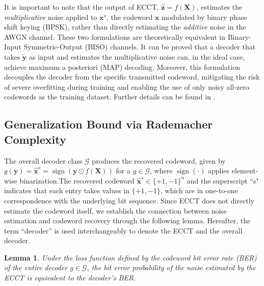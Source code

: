 \documentclass[lettersize,onecolumn]{IEEEtran}
\newtheorem{lemma}{Lemma}
\begin{document}
It is important to note that the output of ECCT, $\hat{\mathbf{z}}=f(\mathbf{X})$, estimates the \emph{multiplicative} noise applied to $\mathbf{x}^{s}$, the codeword $\mathbf{x}$ modulated by binary phase shift keying (BPSK), rather than directly estimating the \emph{additive} noise in the AWGN channel\cite{bennatan2018syndromebasedapproach,choukroun2022ECCT}. These two formulations are theoretically equivalent in Binary-Input Symmetric-Output (BISO) channels\cite{richardson2002LDPCcapacityundermessagepassingdecoding}. It can be proved that a decoder that takes $\tilde{\mathbf{y}}$ as input and estimates the multiplicative noise can, in the ideal case, achieve maximum a posteriori (MAP) decoding. Moreover, this formulation decouples the decoder from the specific transmitted codeword, mitigating the risk of severe overfitting during training and enabling the use of only noisy all-zero codewords as the training dataset. Further details can be found in \cite{bennatan2018syndromebasedapproach}.

\subsection{Generalization Bound via Rademacher Complexity}
The overall decoder class $\mathcal{G}$ produces the recovered codeword, given by $g(\mathbf{y})=\hat{\mathbf{x}}^{s}=\operatorname{sign}(\mathbf{y} \odot f(\mathbf{X}))$ for a $g \in \mathcal{G}$, where $\operatorname{sign}(\cdot)$ applies element-wise binarization.The recovered codeword $\hat{\mathbf{x}}^{s}\in \{+1, -1\}^{n}$ and the superscript ``s" indicates that each entry takes values in $\{+1,-1\}$, which are in one-to-one correspondence with the underlying bit sequence. Since ECCT does not directly estimate the codeword itself, we establish the connection between noise estimation and codeword recovery through the following lemma. Hereafter, the term ``decoder” is used interchangeably to denote the ECCT and the overall decoder.

\begin{lemma}\label{lemma: equivalence of noise vs codeword BER}
    Under the loss function defined by the \emph{codeword} bit error rate (BER) of the entire decoder $g \in \mathcal{G}$, the bit error probability of the \emph{noise} estimated by the ECCT is equivalent to the decoder's BER.
\end{lemma}
\end{document}
